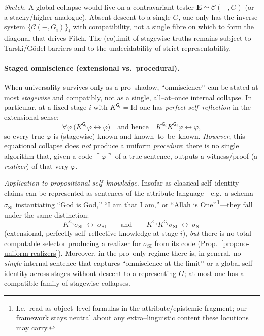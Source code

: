 \documentclass[11pt]{article}
\theoremstyle{upright}
\begin{document}
\noindent\emph{Sketch.} A global collapse would live on a contravariant tester $\mathbf E\simeq\mathcal C(-,G)$ (or a stacky/higher analogue). Absent descent to a single $G$, one only has the inverse system $\{\mathcal C(-,G_i)\}_i$ with compatibility, not a single fibre on which to form the diagonal that drives Fitch. The (co)limit of stagewise truths remains subject to Tarski/Gödel barriers and to the undecidability of strict representability.

\paragraph{Staged omniscience (extensional vs.\ procedural).}
When universality survives only as a pro–shadow, “omniscience’’ can be stated at most \emph{stagewise} and compatibly, not as a single, all–at–once internal collapse. In particular, at a fixed stage $i$ with $K^{\mathsf G_i}=\mathrm{Id}$ one has \emph{perfect self–reflection} in the extensional sense:
\[
\forall\varphi\ \big(K^{\mathsf G_i}\varphi \leftrightarrow \varphi\big)
\quad\text{and hence}\quad
K^{\mathsf G_i}K^{\mathsf G_i}\varphi \leftrightarrow \varphi,
\]
so every true $\varphi$ is (stagewise) known and known–to–be–known. \emph{However}, this equational collapse does \emph{not} produce a uniform \emph{procedure}: there is no single algorithm that, given a code $\ulcorner\varphi\urcorner$ of a true sentence, outputs a witness/proof (a \emph{realizer}) of that very $\varphi$.

\smallskip
\noindent\emph{Application to propositional self–knowledge.}
Insofar as classical self–identity claims can be represented as sentences of the attribute language—e.g.\ a schema $\sigma_{\mathrm{SI}}$ instantiating “God is God,” “I am that I am,” or “Allah is One’’\footnote{I.e.\ read as object–level formulas in the attribute/epistemic fragment; our framework stays neutral about any extra–linguistic content these locutions may carry.}—they fall under the same distinction:
\[
K^{\mathsf G_i}\sigma_{\mathrm{SI}} \ \leftrightarrow\ \sigma_{\mathrm{SI}}
\qquad\text{and}\qquad
K^{\mathsf G_i}K^{\mathsf G_i}\sigma_{\mathrm{SI}} \ \leftrightarrow\ \sigma_{\mathrm{SI}}
\]
(extensional, perfectly self–reflective knowledge at stage $i$), \emph{but} there is no total computable selector producing a realizer for $\sigma_{\mathrm{SI}}$ from its code (Prop.~\ref{prop:no-uniform-realizers}). Moreover, in the pro–only regime there is, in general, no \emph{single} internal sentence that captures “omniscience at the limit’’ or a global self–identity across stages without descent to a representing $G$; at most one has a compatible family of stagewise collapses.
\end{document}

